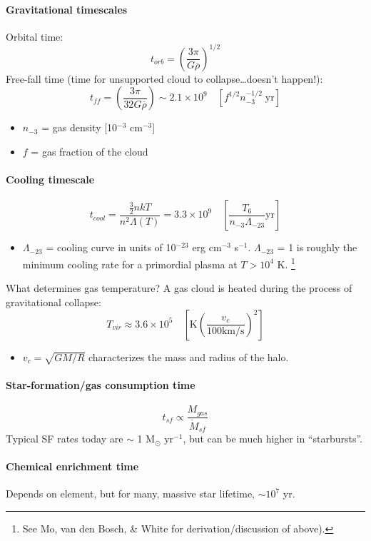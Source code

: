 \documentclass{article}
\begin{document}
\paragraph{Gravitational timescales}
Orbital time:
\[
    t_{orb} = \left( \frac{3\pi}{G\overline{\rho}} \right)^{1/2}
    \]
Free-fall time (time for unsupported cloud to collapse\ldots doesn't happen!):
\[
    t_{ff} = \left( \frac{3\pi}{32G\overline{\rho}} \right)
    \sim 2.1\times10^{9}\quad [f^{1/2}n_{-3}^{-1/2}\; \mathrm{yr}]
    \]
\begin{itemize}
    \item $n_{-3}$ = gas density [10$^{-3}$ cm$^{-3}$]
    \item $f$ = gas fraction of the cloud
\end{itemize}

\paragraph{Cooling timescale}
\[
    t_{cool} = \frac{\frac{3}{2} nkT}{n^{2}\Lambda(T)}
    = 3.3\times10^{9}\quad \left[
        \frac{T_{6}}{n_{-3}\Lambda_{-23}} \mathrm{yr}
        \right]
    \]
\begin{itemize}
    \item $\Lambda_{-23}$ =
        cooling curve in units of 10$^{-23}$ erg cm$^{-3}$ s$^{-1}$.
        $\Lambda_{-23}$ = 1 is roughly the minimum cooling rate for a
        primordial plasma at $T > 10^{4}$ K.
        \footnote{See Mo, van den Bosch, \& White for derivation/discussion of above).}
\end{itemize}
What determines gas temperature?
A gas cloud is heated during the process of gravitational collapse:
\[
    T_{vir} \approx 3.6\times10^{5}\quad \left[
        \mathrm{K} \left( \frac{v_{c}}{100\mathrm{km/s}} \right)^{2}
        \right]
    \]
\begin{itemize}
    \item $v_{c} = \sqrt{GM/R}$ characterizes the mass and radius of the halo.
\end{itemize}

\paragraph{Star-formation/gas consumption time}
\[
    t_{sf} \propto \frac{M_{gas}}{\dot{M}_{sf}}
    \]
Typical SF rates today are $\sim$ 1 M$_{\odot}$ yr$^{-1}$, but can be
much higher in ``starbursts''.

\paragraph{Chemical enrichment time}
Depends on element, but for many, massive star lifetime, $\sim 10^{7}$ yr.
\end{document}
